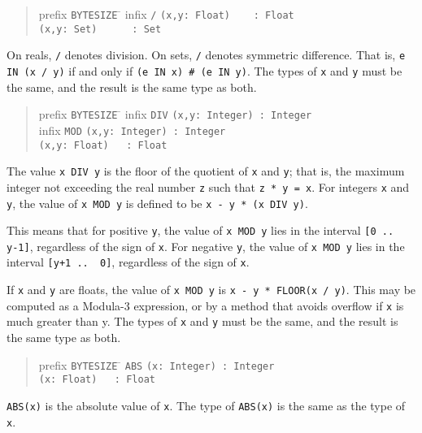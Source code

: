 \documentclass[10pt]{article}
\begin{document}
\begin{quote}
  \begin{tabbing}
    prefix \= \verb|BYTESIZE| \= \kill
    infix  \> \verb|/|       \> \verb|(x,y: Float)    : Float| \\
           \>                \> \verb|(x,y: Set)      : Set|
  \end{tabbing}
\end{quote}
On reals, \verb|/| denotes division.  On sets, \verb|/| denotes symmetric
difference.  That is, \verb|e IN (x / y)| if and only if
\verb|(e IN x) # (e IN y)|.  The types of \verb|x| and \verb|y| must be the
same, and the result is the same type as both.

\begin{quote}
  \begin{tabbing}
    prefix \= \verb|BYTESIZE| \= \kill
    infix  \> \verb|DIV|     \> \verb|(x,y: Integer) : Integer| \\
    infix  \> \verb|MOD|     \> \verb|(x,y: Integer) : Integer| \\
           \>                \> \verb|(x,y: Float)   : Float|
  \end{tabbing}
\end{quote}
The value \verb|x DIV y| is the floor of the quotient of \verb|x| and
\verb|y|; that is, the maximum integer not exceeding the real number \verb|z|
such that \verb|z * y = x|.  For integers \verb|x| and \verb|y|, the value of
\verb|x MOD y| is defined to be \verb|x - y * (x DIV y)|.

This means that for positive \verb|y|, the value of \verb|x MOD y| lies in the
interval \verb|[0 ..  y-1]|, regardless of the sign of \verb|x|.  For negative
\verb|y|, the value of \verb|x MOD y| lies in the interval \verb|[y+1 ..  0]|,
regardless of the sign of \verb|x|.

If \verb|x| and \verb|y| are floats, the value of \verb|x MOD y| is
\verb|x - y * FLOOR(x / y)|.  This may be computed as a Modula-3 expression,
or by a method that avoids overflow if \verb|x| is much greater than y.  The
types of \verb|x| and \verb|y| must be the same, and the result is the same
type as both.

\begin{quote}
  \begin{tabbing}
    prefix \= \verb|BYTESIZE| \= \kill
           \> \verb|ABS|     \> \verb|(x: Integer) : Integer| \\
           \>                \> \verb|(x: Float)   : Float|
  \end{tabbing}
\end{quote}
\verb|ABS(x)| is the absolute value of \verb|x|.  The type of \verb|ABS(x)| is
the same as the type of \verb|x|.
\end{document}
